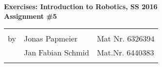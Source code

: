 \documentclass[11pt]{article}
\begin{document}
	
	\begin{center}
		\textbf{
			Exercises: Introduction to Robotics, SS 2016\\
			Assignment \#5\\
		}
		
		\begin{tabular}{lll}
			& \\
			by & Jonas Papmeier & Mat Nr. 6326394\\
			& Jan Fabian Schmid & Mat.Nr. 6440383\\
			\\
			\hline
		\end{tabular}
	\end{center}
	
	
	
	
	
	
	
	
	
\end{document}
